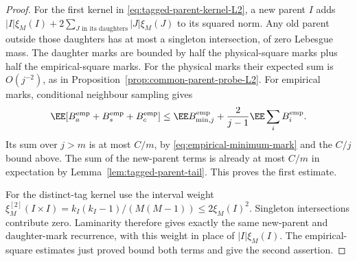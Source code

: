 \documentclass[11pt,letterpaper]{article}
\begin{document}
\begin{proof}
For the first kernel in \eqref{eq:tagged-parent-kernel-L2},
a new parent $I$ adds
$|I|\xi_M(I)+2\sum_{J\text{ in its daughters}}|J|\xi_M(J)$
to its squared norm. Any old parent outside those daughters
has at most a singleton intersection, of zero Lebesgue mass.
The daughter marks are bounded by half the physical-square
marks plus half the empirical-square marks. For the physical
marks their expected sum is $O(j^{-2})$, as in
Proposition~\ref{prop:common-parent-probe-L2}.
For empirical marks, conditional neighbour sampling gives
\[
 \EE[B_a^{\rm emp}+B_s^{\rm emp}+B_c^{\rm emp}]
 \le\EE B_{\min,j}^{\rm emp}
             +\frac{2}{j-1}\EE\sum_iB_i^{\rm emp}.
\]
Its sum over $j>m$ is at most $C/m$, by
\eqref{eq:empirical-minimum-mark} and the $C/j$ bound above.
The sum of the new-parent terms is already at most $C/m$
in expectation by Lemma~\ref{lem:tagged-parent-tail}.
This proves the first estimate.

For the distinct-tag kernel use the interval weight
$\xi_M^{[2]}(I\times I)=k_I(k_I-1)/(M(M-1))\le2\xi_M(I)^2$.
Singleton intersections contribute zero. Laminarity therefore
gives exactly the same new-parent and daughter-mark recurrence,
with this weight in place of $|I|\xi_M(I)$.
The empirical-square estimates just proved bound both terms
and give the second assertion.
\end{proof}
\end{document}
